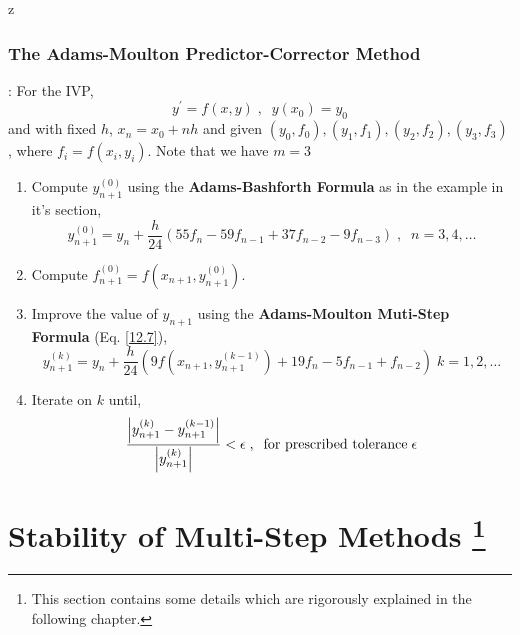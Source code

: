 z\documentclass[a4paper,12pt,twoside]{book}
\newcommand{\algo}[0]{\boxed{\textbf{\textit{Algorithm}}}}
\DeclarePairedDelimiter\abs{\lvert}{\rvert}
\renewcommand{\d}[0]{\prime}
\begin{document}
\subsubsection{The Adams-Moulton Predictor-Corrector Method}
\algo : For the IVP,
\[y^\d = f(x,y)\;,\;\;y(x_0) = y_0\]
and with fixed $h$, $x_n = x_0 +nh$ and given $(y_0,f_0), (y_1,f_1), (y_2,f_2), (y_3, f_3)$, where $f_i = f(x_i,y_i)$. Note that we have $m=3$
\begin{enumerate}
    \item {Compute $y_{n+1}^{(0)}$ using the \textbf{Adams-Bashforth Formula} as in the example in it's section,
    \[y_{n+1}^{(0)} = y_n + \frac{h}{24} (55f_n - 59 f_{n-1} + 37 f_{n-2} - 9 f_{n-3}) \;,\;\;n=3,4,\dots\]
    }
    \item{Compute $f_{n+1}^{(0)} = f(x_{n+1}, y_{n+1}^{(0)})$.}
    \item{Improve the value of $y_{n+1}$ using the \textbf{Adams-Moulton Muti-Step Formula} (Eq. \ref{12.7}),
    \[ y_{n+1}^{(k)} = y_n +  \frac{h}{24} \left(9f(x_{n+1}, y_{n+1}^{(k-1)}) + 19f_n -5f_{n-1} + f_{n-2}\right) \;k=1,2,\dots\]
    }
    \item{Iterate on $k$ until,
    \[\frac{\abs*{y^{(k)}_{n+1} - y_{n+1}^{(k-1)}}}{\abs*{y_{n+1}^{(k)}}} < \epsilon\;,\;\; \text{for prescribed tolerance} \;\epsilon\]
    }
\end{enumerate}

\section{Stability of Multi-Step Methods \protect\footnote{This section contains some details which are rigorously explained in the following chapter.}}
\end{document}
